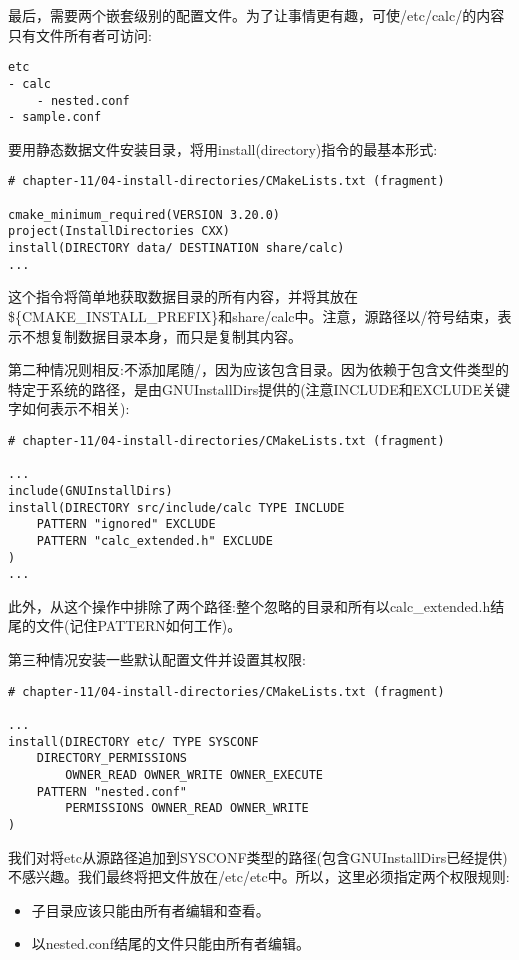 最后，需要两个嵌套级别的配置文件。为了让事情更有趣，可使/etc/calc/的内容只有文件所有者可访问:

\begin{lstlisting}[style=stylePython]
etc
- calc
	- nested.conf
- sample.conf
\end{lstlisting}

要用静态数据文件安装目录，将用install(directory)指令的最基本形式:

\begin{lstlisting}[style=styleCMake]
# chapter-11/04-install-directories/CMakeLists.txt (fragment)

cmake_minimum_required(VERSION 3.20.0)
project(InstallDirectories CXX)
install(DIRECTORY data/ DESTINATION share/calc)
...
\end{lstlisting}

这个指令将简单地获取数据目录的所有内容，并将其放在\$\{CMAKE\_INSTALL\_PREFIX\}和share/calc中。注意，源路径以/符号结束，表示不想复制数据目录本身，而只是复制其内容。

第二种情况则相反:不添加尾随/，因为应该包含目录。因为依赖于包含文件类型的特定于系统的路径，是由GNUInstallDirs提供的(注意INCLUDE和EXCLUDE关键字如何表示不相关):

\begin{lstlisting}[style=styleCMake]
# chapter-11/04-install-directories/CMakeLists.txt (fragment)

...
include(GNUInstallDirs)
install(DIRECTORY src/include/calc TYPE INCLUDE
	PATTERN "ignored" EXCLUDE
	PATTERN "calc_extended.h" EXCLUDE
)
...
\end{lstlisting}

此外，从这个操作中排除了两个路径:整个忽略的目录和所有以calc\_extended.h结尾的文件(记住PATTERN如何工作)。

第三种情况安装一些默认配置文件并设置其权限:

\begin{lstlisting}[style=styleCMake]
# chapter-11/04-install-directories/CMakeLists.txt (fragment)

...
install(DIRECTORY etc/ TYPE SYSCONF
	DIRECTORY_PERMISSIONS
		OWNER_READ OWNER_WRITE OWNER_EXECUTE
	PATTERN "nested.conf"
		PERMISSIONS OWNER_READ OWNER_WRITE
)
\end{lstlisting}

我们对将etc从源路径追加到SYSCONF类型的路径(包含GNUInstallDirs已经提供)不感兴趣。我们最终将把文件放在/etc/etc中。所以，这里必须指定两个权限规则:

\begin{itemize}
\item 
子目录应该只能由所有者编辑和查看。

\item 
以nested.conf结尾的文件只能由所有者编辑。
\end{itemize}

